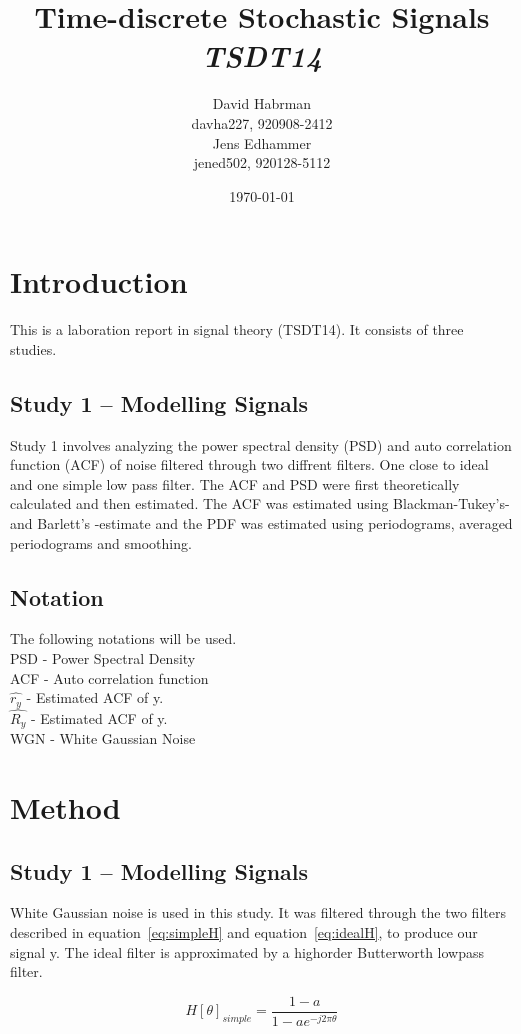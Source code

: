 \documentclass[10pt]{article}
\title{Time-discrete Stochastic Signals\\
\emph{TSDT14}}
\author{David Habrman \\ davha227, 920908-2412\\
Jens Edhammer \\ jened502, 920128-5112 }
\date{\today}
\begin{document}
\maketitle

\section{Introduction}
This is a laboration report in signal theory (TSDT14). It consists of three studies.

\subsection{Study 1 – Modelling Signals}
Study 1 involves analyzing the power spectral density (PSD) and auto correlation function (ACF)
of noise filtered through two diffrent filters. One close to ideal and one simple low pass filter.
The ACF and PSD were first theoretically calculated and then estimated.
The ACF was estimated using Blackman-Tukey's- and Barlett's -estimate and the
PDF was estimated using periodograms, averaged periodograms and smoothing.

\subsection{Notation}
The following notations will be used. \\
PSD - Power Spectral Density \\
ACF - Auto correlation function \\
$\hat{r_y}$ - Estimated ACF of y. \\
$\hat{R_y}$ - Estimated ACF of y. \\
WGN - White Gaussian Noise

\section{Method}
\subsection{Study 1 – Modelling Signals}

White Gaussian noise is used in this study. It was filtered through the two
 filters described in equation~\ref{eq:simpleH} and equation~\ref{eq:idealH},
  to produce our signal y.
 The ideal filter is approximated by a highorder Butterworth lowpass filter.

\begin{equation}
  \label{eq:simpleH}
  H[\theta]_{simple} =\frac{1-a}{1-ae^{-j2\pi\theta }}
\end{equation}
\end{document}
